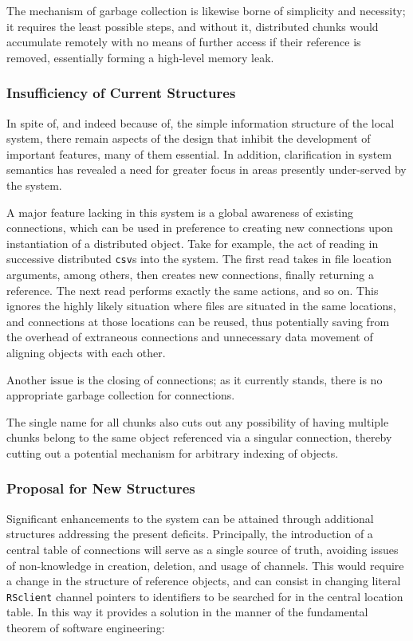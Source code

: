The mechanism of garbage collection is likewise borne of simplicity and
necessity; it requires the least possible steps, and without it,
distributed chunks would accumulate remotely with no means of further
access if their reference is removed, essentially forming a high-level
memory leak.

\hypertarget{insufficiency-of-current-structures}{%
\subsubsection{Insufficiency of Current
Structures}\label{insufficiency-of-current-structures}}

In spite of, and indeed because of, the simple information structure of
the local system, there remain aspects of the design that inhibit the
development of important features, many of them essential. In addition,
clarification in system semantics has revealed a need for greater focus
in areas presently under-served by the system.

A major feature lacking in this system is a global awareness of existing
connections, which can be used in preference to creating new connections
upon instantiation of a distributed object. Take for example, the act of
reading in successive distributed \texttt{csv}s into the system. The
first read takes in file location arguments, among others, then creates
new connections, finally returning a reference. The next read performs
exactly the same actions, and so on. This ignores the highly likely
situation where files are situated in the same locations, and
connections at those locations can be reused, thus potentially saving
from the overhead of extraneous connections and unnecessary data
movement of aligning objects with each other.

Another issue is the closing of connections; as it currently stands,
there is no appropriate garbage collection for connections.

The single name for all chunks also cuts out any possibility of having
multiple chunks belong to the same object referenced via a singular
connection, thereby cutting out a potential mechanism for arbitrary
indexing of objects.

\hypertarget{sec:localproposal}{%
\subsubsection{Proposal for New Structures}\label{sec:localproposal}}

Significant enhancements to the system can be attained through
additional structures addressing the present deficits. Principally, the
introduction of a central table of connections will serve as a single
source of truth, avoiding issues of non-knowledge in creation, deletion,
and usage of channels. This would require a change in the structure of
reference objects, and can consist in changing literal \texttt{RSclient}
channel pointers to identifiers to be searched for in the central
location table. In this way it provides a solution in the manner of the
fundamental theorem of software engineering:

